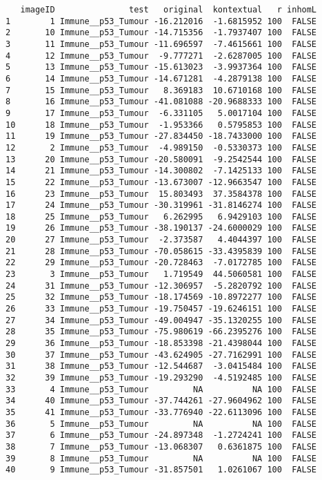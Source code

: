 \documentclass[
  letterpaper,
  DIV=11,
  numbers=noendperiod]{scrreprt}
\begin{document}
\begin{verbatim}
   imageID               test   original  kontextual   r inhomL
1        1 Immune__p53_Tumour -16.212016  -1.6815952 100  FALSE
2       10 Immune__p53_Tumour -14.715356  -1.7937407 100  FALSE
3       11 Immune__p53_Tumour -11.696597  -7.4615661 100  FALSE
4       12 Immune__p53_Tumour  -9.777271  -2.6287005 100  FALSE
5       13 Immune__p53_Tumour -15.613023  -3.9937364 100  FALSE
6       14 Immune__p53_Tumour -14.671281  -4.2879138 100  FALSE
7       15 Immune__p53_Tumour   8.369183  10.6710168 100  FALSE
8       16 Immune__p53_Tumour -41.081088 -20.9688333 100  FALSE
9       17 Immune__p53_Tumour  -6.331105   5.0017104 100  FALSE
10      18 Immune__p53_Tumour  -1.953366   0.5795853 100  FALSE
11      19 Immune__p53_Tumour -27.834450 -18.7433000 100  FALSE
12       2 Immune__p53_Tumour  -4.989150  -0.5330373 100  FALSE
13      20 Immune__p53_Tumour -20.580091  -9.2542544 100  FALSE
14      21 Immune__p53_Tumour -14.300802  -7.1425133 100  FALSE
15      22 Immune__p53_Tumour -13.673007 -12.9663547 100  FALSE
16      23 Immune__p53_Tumour  15.803493  37.3584378 100  FALSE
17      24 Immune__p53_Tumour -30.319961 -31.8146274 100  FALSE
18      25 Immune__p53_Tumour   6.262995   6.9429103 100  FALSE
19      26 Immune__p53_Tumour -38.190137 -24.6000029 100  FALSE
20      27 Immune__p53_Tumour  -2.373587   4.4044397 100  FALSE
21      28 Immune__p53_Tumour -70.058615 -33.4395839 100  FALSE
22      29 Immune__p53_Tumour -20.728463  -7.0172785 100  FALSE
23       3 Immune__p53_Tumour   1.719549  44.5060581 100  FALSE
24      31 Immune__p53_Tumour -12.306957  -5.2820792 100  FALSE
25      32 Immune__p53_Tumour -18.174569 -10.8972277 100  FALSE
26      33 Immune__p53_Tumour -19.750457 -19.6246151 100  FALSE
27      34 Immune__p53_Tumour -49.004947 -35.1320255 100  FALSE
28      35 Immune__p53_Tumour -75.980619 -66.2395276 100  FALSE
29      36 Immune__p53_Tumour -18.853398 -21.4398044 100  FALSE
30      37 Immune__p53_Tumour -43.624905 -27.7162991 100  FALSE
31      38 Immune__p53_Tumour -12.544687  -3.0415484 100  FALSE
32      39 Immune__p53_Tumour -19.293290  -4.5192485 100  FALSE
33       4 Immune__p53_Tumour         NA          NA 100  FALSE
34      40 Immune__p53_Tumour -37.744261 -27.9604962 100  FALSE
35      41 Immune__p53_Tumour -33.776940 -22.6113096 100  FALSE
36       5 Immune__p53_Tumour         NA          NA 100  FALSE
37       6 Immune__p53_Tumour -24.897348  -1.2724241 100  FALSE
38       7 Immune__p53_Tumour -13.068307   0.6361875 100  FALSE
39       8 Immune__p53_Tumour         NA          NA 100  FALSE
40       9 Immune__p53_Tumour -31.857501   1.0261067 100  FALSE
\end{verbatim}
\end{document}
